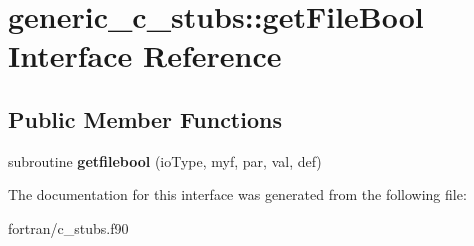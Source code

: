\hypertarget{interfacegeneric__c__stubs_1_1get_file_bool}{}\section{generic\+\_\+c\+\_\+stubs\+:\+:get\+File\+Bool Interface Reference}
\label{interfacegeneric__c__stubs_1_1get_file_bool}
\subsection*{Public Member Functions}
\begin{DoxyCompactItemize}
\item 
\mbox{\label{interfacegeneric__c__stubs_1_1get_file_bool_a8360232fc5cbcd0217e13b77f9d0f6dc}} 
subroutine {\bfseries getfilebool} (io\+Type, myf, par, val, def)
\end{DoxyCompactItemize}


The documentation for this interface was generated from the following file\+:\begin{DoxyCompactItemize}
\item 
fortran/c\+\_\+stubs.\+f90\end{DoxyCompactItemize}
